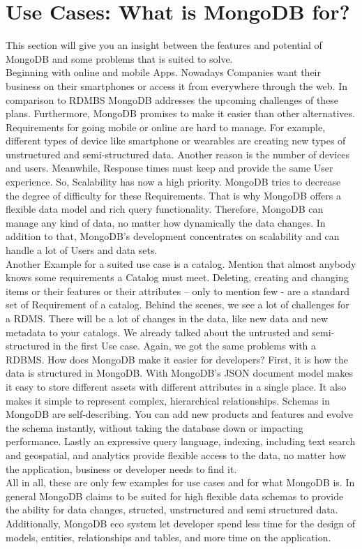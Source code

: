 \section{Use Cases: What is MongoDB for?}
This section will give you an insight between the features and potential of MongoDB and some problems that is suited to solve.
\\
Beginning with online and mobile Apps. Nowadays Companies want their business on their smartphones or access it from everywhere through the web. In comparison to RDMBS MongoDB addresses the upcoming challenges of these plans. Furthermore, MongoDB promises to make it easier than other alternatives. Requirements for going mobile or online are hard to manage. For example, different types of device like smartphone or wearables are creating new types of unstructured and semi-structured data. Another reason is the number of devices and users. Meanwhile, Response times must keep and provide the same User experience. So, Scalability has now a high priority. MongoDB tries to decrease the degree of difficulty for these Requirements. That is why MongoDB offers a flexible data model and rich query functionality. Therefore, MongoDB can manage any kind of data, no matter how dynamically the data changes. In addition to that, MongoDB’s development concentrates on scalability and can handle a lot of Users and data sets\cite{MongoDBInc.2013a}.
\\
Another Example for a suited use case is a catalog. Mention that almost anybody knows some requirements a Catalog must meet. Deleting, creating and changing items or their features or their attributes – only to mention few - are a standard set of Requirement of a catalog. Behind the scenes, we see a lot of challenges for a RDMS. There will be a lot of changes in the data, like new data and new metadata to your catalogs. We already talked about the untrusted and semi-structured in the first Use case. Again, we got the same problems with a RDBMS. How does MongoDB make it easier for developers? First, it is how the data is structured in MongoDB. With MongoDB’s JSON document model makes it easy to store different assets with different attributes in a single place. It also makes it simple to represent complex, hierarchical relationships. Schemas in MongoDB are self-describing. You can add new products and features and evolve the schema instantly, without taking the database down or impacting performance. Lastly an expressive query language, indexing, including text search and geospatial, and analytics provide flexible access to the data, no matter how the application, business or developer needs to find it\cite{MongoDBInc.2013a}.
\\
All in all, these are only few examples for use cases and for what MongoDB is. In general MongoDB claims to be suited for high flexible data schemas to provide the ability for data changes, structed, unstructured and semi structured data. Additionally, MongoDB eco system let developer spend less time for the design of models, entities, relationships and tables, and more time on the application\cite{MongoDBInc.2013a}.

